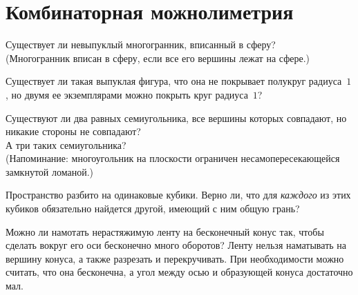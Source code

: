 
\section*{Комбинаторная можнолиметрия}


\begin{problems}


\item
Существует ли невыпуклый многогранник, вписанный в сферу?
\\
(Многогранник вписан в сферу, если все его вершины лежат на сфере.)

\item
Существует ли такая выпуклая фигура, что она не покрывает полукруг радиуса~$1$,
но двумя ее экземплярами можно покрыть круг радиуса~$1$?

\item
\subproblem
Существуют ли два равных семиугольника, все вершины которых совпадают,
но никакие стороны не совпадают?
\\
\subproblem
А три таких семиугольника?
\\
(Напоминание: многоугольник на плоскости ограничен несамопересекающейся
замкнутой ломаной.)

\item
Пространство разбито на одинаковые кубики.
Верно ли, что для \emph{каждого} из этих кубиков обязательно найдется другой,
имеющий с ним общую грань?

\item
Можно ли намотать нерастяжимую ленту на бесконечный конус так, чтобы сделать
вокруг его оси бесконечно много оборотов?
Ленту нельзя наматывать на вершину конуса, а также разрезать и перекручивать.
При необходимости можно считать, что она бесконечна, а угол между осью
и образующей конуса достаточно мал.


\end{problems}
